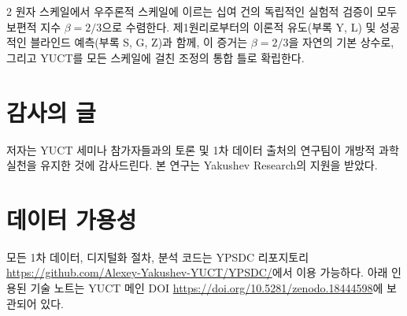 \documentclass[11pt,a4paper]{article}
\newcommand{\betaf}{\beta}
\begin{document}
\begin{multicols}{2}
		원자 스케일에서 우주론적 스케일에 이르는 십여 건의 독립적인 실험적 검증이 모두 보편적 지수 \(\betaf = 2/3\)으로 수렴한다. 제1원리로부터의 이론적 유도(부록 Y, L) 및 성공적인 블라인드 예측(부록 S, G, Z)과 함께, 이 증거는 \(\betaf = 2/3\)을 자연의 기본 상수로, 그리고 YUCT를 모든 스케일에 걸친 조정의 통합 틀로 확립한다.
		
		\section*{감사의 글}
		
		저자는 YUCT 세미나 참가자들과의 토론 및 1차 데이터 출처의 연구팀이 개방적 과학 실천을 유지한 것에 감사드린다. 본 연구는 Yakushev Research의 지원을 받았다.
		
		\section*{데이터 가용성}
		
		모든 1차 데이터, 디지털화 절차, 분석 코드는 YPSDC 리포지토리 \url{https://github.com/Alexey-Yakushev-YUCT/YPSDC/}에서 이용 가능하다. 아래 인용된 기술 노트는 YUCT 메인 DOI \url{https://doi.org/10.5281/zenodo.18444598}에 보관되어 있다.
		

\end{multicols}
\end{document}
